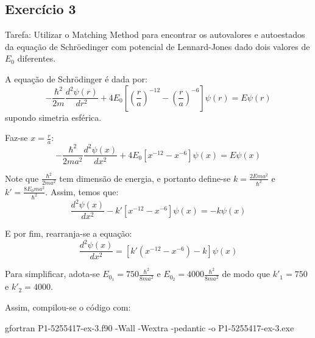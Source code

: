 \documentclass[12pt, a4paper]{article} %
\begin{document}
        \subsection{Exerc\'icio 3}

            Tarefa: Utilizar o Matching Method para encontrar os autovalores e autoestados da equa\c{c}\~ao de Schr\"oedinger com potencial de Lennard-Jones dado dois valores de $E_{0}$ diferentes.

            A equa\c{c}\~ao de Schr\"odinger \'e dada por:
            \begin{equation*}
                -\frac{\hbar^{2}}{2m} \frac{d^{2}\psi(r)}{dr^{2}} + 4E_{0} \left[ \left( \frac{r}{a} \right)^{-12} - \left( \frac{r}{a} \right)^{-6} \right]\psi(r) = E\psi(r)
            \end{equation*}
            supondo simetria esf\'erica.

            Faz-se $x = \frac{r}{a}$:
            \begin{equation*}
                -\frac{\hbar^{2}}{2ma^2} \frac{d^{2}\psi(x)}{dx^{2}} + 4E_{0} \left[ x^{-12} - x^{-6} \right]\psi(x) = E\psi(x)
            \end{equation*}

            Note que $\frac{\hbar^{2}}{2ma^2}$ tem dimens\~ao de energia, e portanto define-se $k = \frac{2Ema^2}{\hbar^{2}}$ e $k' = \frac{8E_{0}ma^2}{\hbar^{2}}$. Assim, temos que:
            \begin{equation*}
                \frac{d^{2}\psi(x)}{dx^{2}} - k'\left[  x^{-12} - x^{-6} \right]\psi(x) = -k\psi(x)
            \end{equation*}

            E por fim, rearranja-se a equa\c{c}\~ao:
            \begin{equation*}
                \frac{d^{2}\psi(x)}{dx^{2}} = \left[k'\left( x^{-12} - x^{-6} \right) -k\right]\psi(x)
            \end{equation*}

            Para simplificar, adota-se $E_{0_{1}} = 750\frac{\hbar^{2}}{8ma^2}$ e $E_{0_{2}} = 4000\frac{\hbar^{2}}{8ma^2}$ de modo que $k'_{1} = 750$ e $k'_{2} = 4000$.

            Assim, compilou-se o código com:

            gfortran P1-5255417-ex-3.f90 -Wall -Wextra -pedantic -o P1-5255417-ex-3.exe
\end{document}
